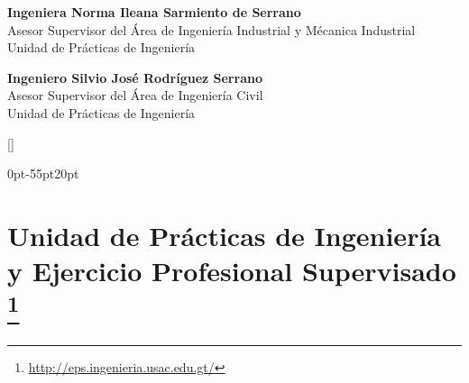 \documentclass[11pt,spanish,Letterpaper,openany]{book}
\makeatletter
\renewcommand\mainmatter{\clearpage\@mainmattertrue\pagenumbering{arabic}}
\let\rmarkdownfootnote\footnote%
\def\footnote{\protect\rmarkdownfootnote}
\makeatother
\begin{document}
\textbf{Ingeniera Norma Ileana Sarmiento de Serrano}\\
Asesor Supervisor del Área de Ingeniería Industrial y Mécanica Industrial\\
Unidad de Prácticas de Ingeniería
\bigskip

\textbf{Ingeniero Silvio José Rodríguez Serrano}\\
Asesor Supervisor del Área de Ingeniería Civil\\
Unidad de Prácticas de Ingeniería
\bigskip

\setcounter{tocdepth}{0}
\tableofcontents

\mainmatter

[\vspace{1ex}\titlerule]

\titlespacing*{\chapter} {0pt}{-55pt}{20pt}

\hypertarget{unidadeps}{%
\chapter[Unidad de Prácticas de Ingeniería y Ejercicio Profesional Supervisado ]{\texorpdfstring{Unidad de Prácticas de Ingeniería y Ejercicio Profesional Supervisado \footnote{\url{http://eps.ingenieria.usac.edu.gt/}}}{Unidad de Prácticas de Ingeniería y Ejercicio Profesional Supervisado }}\label{unidadeps}}
\end{document}
